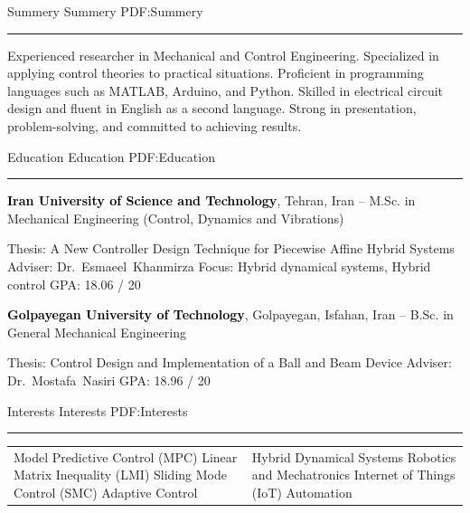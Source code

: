 \documentclass[letterpaper,MMMyyyy]{ResumeTemplate}
\begin{document}
\begin{Body}

\Section
{Summery}
{Summery}
{PDF:Summery}
\textcolor{Forestg}{\vspace{0.05cm}\hrule height 0.1cm}\BigGap
\Entry
\BulletItem Experienced researcher in Mechanical and Control Engineering.
\BulletItem Specialized in applying control theories to practical situations.
\BulletItem Proficient in programming languages such as MATLAB, Arduino, and Python.
\BulletItem Skilled in electrical circuit design and fluent in English as a second language.
\BulletItem Strong in presentation, problem-solving, and committed to achieving results.

\Section
{Education}
{Education}
{PDF:Education}
\textcolor{Forestg}{\vspace{0.05cm}\hrule height 0.1cm}\BigGap
\Entry
{\textcolor{black}{\textbf{Iran University of Science and Technology}}, Tehran, Iran}
\hfill
{\textcolor{OrangeY}{ --
	}}
\Gap
\BulletItem
M.Sc. in
{Mechanical Engineering \small{(Control, Dynamics and Vibrations)}}

\begin{Detail}
\SubBulletItem
Thesis:
{A New Controller Design Technique for Piecewise Affine Hybrid Systems}
\SubBulletItem
Adviser:
Dr.~Esmaeel~Khanmirza
\SubBulletItem
Focus:
Hybrid dynamical systems, Hybrid control
\SubBulletItem
GPA: 18.06 / 20
\end{Detail}


\BigGap
\Entry
{\textcolor{black}{\textbf{Golpayegan University of Technology}},
Golpayegan, Isfahan, Iran}
\hfill
\textcolor{OrangeY}{ --
}
\Gap
\BulletItem
B.Sc. in
{General Mechanical Engineering}

\begin{Detail}
\SubBulletItem
Thesis: Control Design and Implementation of a Ball and Beam Device
\SubBulletItem
Adviser:
Dr.~Mostafa~Nasiri
\SubBulletItem
GPA: 18.96 / 20
\end{Detail}



\Section
{Interests}
{Interests}
{PDF:Interests}
\textcolor{Forestg}{\vspace{0.05cm}\hrule height 0.1cm}\BigGap
\Entry

\begin{center}
	\begin{tabular}{ m{8cm} m{8cm} }
		\BulletItem
		Model Predictive Control (MPC)
		\BulletItem
		Linear Matrix Inequality (LMI)
		\BulletItem
		Sliding Mode Control (SMC)
		\BulletItem
		Adaptive Control
		 & \BulletItem
		Hybrid Dynamical Systems
		\BulletItem
		Robotics and Mechatronics
		\BulletItem
		Internet of Things (IoT)
		\BulletItem
		Automation
	\end{tabular}
\end{center}


\end{Body}
\end{document}
